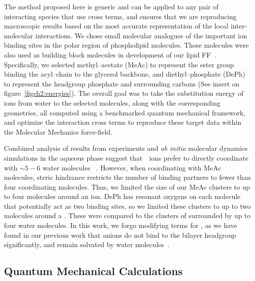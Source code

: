 The method proposed here is generic and can be applied to any pair of
interacting species that use cross terms, and ensures that we are
reproducing macroscopic results based on the most accurate
representation of the local inter-molecular interactions.  We chose
small molecular analogues of the important ion binding
sites in the polar region of phospholipid
molecules. These molecules were also used as building block molecules in development of our lipid
FF~\cite{kruczek:2017,chiu:2009}. Specifically, we selected
methyl--acetate (MeAc) to represent the ester group binding the
acyl--chain to the glycerol backbone, and diethyl--phosphate (DePh) to
represent the headgroup phosphate and surrounding carbons (See insert on figure~\ref{figch2:energies}). 
The overall goal was to take the substitution energy of ions from
water to the selected molecules, along with the corresponding
geometries, all computed using a benchmarked quantum mechanical framework, 
and optimize the interaction cross terms to reproduce these target data 
within the Molecular Mechanics force-field.

Combined analysis of results from experiments and \emph{ab initio} molecular dynamics simulations
in the aqueous phase suggest that~\na~ions prefer to directly coordinate 
with $\sim 5-6$ water molecules~
\cite{varma:2006:coordination,mason:2006:neutron,galib:2017:revisiting,timko:2010:dissociation,smirnov:2020}.
However, when coordinating with MeAc molecules, steric hindrance restricts the 
number of binding partners to fewer than four coordinating molecules.  
Thus, we limited the size of our MeAc clusters to up to four molecules around an ion. 
DePh has resonant oxygens on each molecule that potentially act as two binding sites, so we
limited these clusters to up to two molecules around a \na. These were
compared to the clusters of \na surrounded by up to four water
molecules.
In this work, we forgo modifying terms for \cl, as we have found in our previous work 
that anions do not bind to the bilayer headgroup significantly, and remain solvated 
by water molecules~\cite{kruczek:2017}.

\subsection{Quantum Mechanical Calculations}


